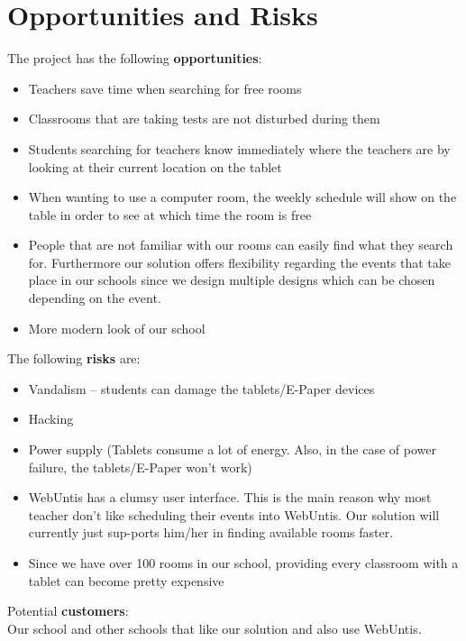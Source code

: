 \documentclass{article}
\newenvironment{explanation}{%
   \color{black}
}{}
\begin{document}
\section{Opportunities and Risks}
\begin{explanation}
The project has the following \textbf{opportunities}:
\begin{itemize}
    \item Teachers save time when searching for free rooms
    \item Classrooms that are taking tests are not disturbed during them
    \item Students searching for teachers know immediately where the teachers are by looking at their current location on the tablet
    \item When wanting to use a computer room, the weekly schedule will show on the table in order to see at which time the room is free
    \item People that are not familiar with our rooms can easily find what they search for. Furthermore our solution offers flexibility regarding the events that take place in our schools since we design multiple designs which can be chosen depending on the event.
\item More modern look of our school
\end{itemize}

\vspace{0.5cm}
The following \textbf{risks} are:
\begin{itemize}
    \item Vandalism – students can damage the tablets/E-Paper devices
    \item Hacking
    \item Power supply (Tablets consume a lot of energy. Also, in the case of power failure, the tablets/E-Paper won’t work)
    \item WebUntis has a clumsy user interface. This is the main reason why most teacher don’t like scheduling their events into WebUntis. Our solution will currently just sup-ports him/her in finding available rooms faster.
    \item Since we have over 100 rooms in our school, providing every classroom with a tablet can become pretty expensive
\end{itemize}

\vspace{0.5cm}
Potential \textbf{customers}: \\
Our school and other schools that like our solution and also use WebUntis.
\end{explanation}
\pagebreak
\end{document}
